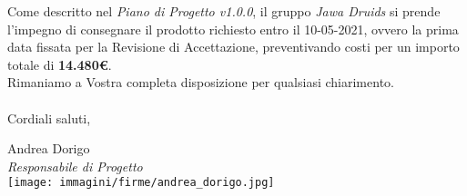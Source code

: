 \documentclass[a4paper,12pt]{report}
\begin{document}
Come descritto nel \textit{Piano di Progetto v1.0.0}, il gruppo \textit{Jawa Druids} si prende l’impegno di consegnare il prodotto richiesto entro il 10-05-2021, ovvero la prima data fissata per la Revisione di Accettazione, preventivando costi per un importo totale di \textbf{14.480\euro}.\\
Rimaniamo a Vostra completa disposizione per qualsiasi chiarimento.\\
\vspace{0.3cm}
\\
Cordiali saluti,
\begin{flushright}
  Andrea Dorigo \\
  \textit{Responsabile di Progetto} \\
  \texttt{[image: immagini/firme/andrea\_dorigo.jpg]}\\[4ex]
\end{flushright}
\end{document}
